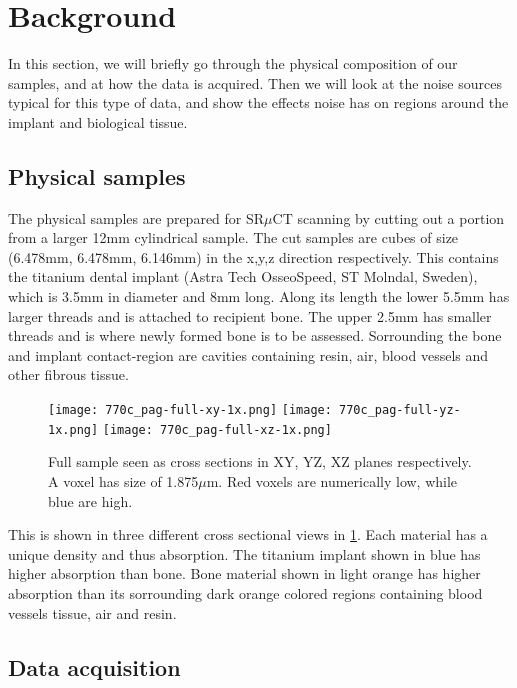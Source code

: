 \section{Background}
\label{sec:background}

In this section, we will briefly go through the physical composition of our samples, and at how
the data is acquired. Then we will look at the noise sources typical for this type of data, and
show the effects noise has on regions around the implant and biological tissue.

\subsection{Physical samples}

The physical samples are prepared for SR$\mu$CT scanning by cutting out a portion from a larger
12mm cylindrical sample. The cut samples are cubes of size (6.478mm, 6.478mm, 6.146mm) in the
x,y,z direction respectively. This contains the titanium dental implant (Astra Tech OsseoSpeed,
ST Molndal, Sweden), which is 3.5mm in diameter and 8mm long. Along its length the lower 5.5mm
has larger threads and is attached to recipient bone. The upper 2.5mm has smaller threads and
is where newly formed bone is to be assessed. Sorrounding the bone and implant contact-region
are cavities containing resin, air, blood vessels and other fibrous tissue.

\begin{figure}
\centering
\texttt{[image: 770c\_pag-full-xy-1x.png]}
\texttt{[image: 770c\_pag-full-yz-1x.png]}
\texttt{[image: 770c\_pag-full-xz-1x.png]}
\caption{Full sample seen as cross sections in XY, YZ, XZ planes respectively. A voxel has size of
1.875$\mu$m. Red voxels are numerically low, while blue are high.}
\label{fig:3viewsample}
\end{figure}

This is shown in three different cross sectional views
in \cref{fig:3viewsample}. Each material has a unique density and thus absorption. The titanium
implant shown in blue has higher absorption than bone. Bone material shown in light orange has
higher absorption than its sorrounding dark orange colored regions containing blood vessels
tissue, air and resin.

\subsection{Data acquisition}

